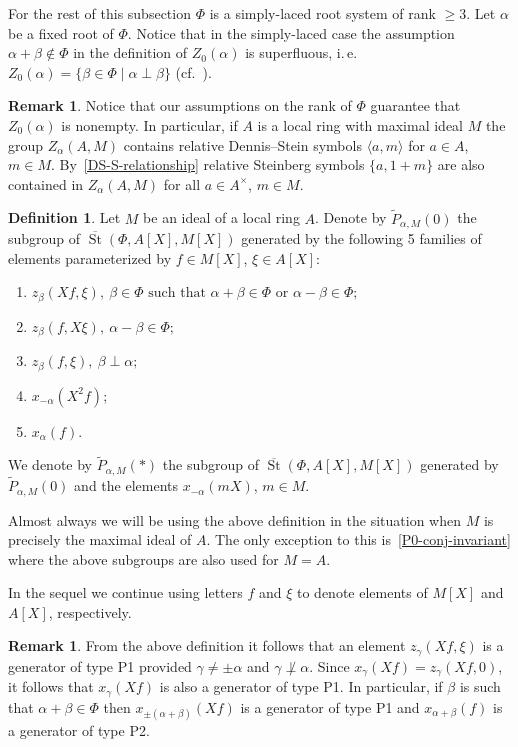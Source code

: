 \documentclass[10pt,a4paper,twoside]{article}
\theoremstyle{remark}
\theoremstyle{definition}
\numberwithin{lemma}{section}
\numberwithin{prop}{section}
\numberwithin{corollary}{section}
\numberwithin{externaltheorem}{section}
\newtheorem{df}[lemma]{Definition} \Crefname{df}{Definition}{Definitions}
\newtheorem{rem}[lemma]{Remark}
\DeclareMathOperator{\St}{St}
\numberwithin{equation}{section}
\begin{document}
For the rest of this subsection $\Phi$ is a simply-laced root system of rank $\geq 3$.
Let $\alpha$ be a fixed root of $\Phi$. 
Notice that in the simply-laced case the assumption $\alpha+\beta\not\in \Phi$ in the definition of $Z_0(\alpha)$ is superfluous, i.\,e. $Z_0(\alpha) = \{ \beta\in\Phi \mid \alpha \perp \beta \}$
(cf.~\cite[Proposition~5.7]{St71}).

\begin{rem}\label{Z-DS} Notice that our assumptions on the rank of $\Phi$ guarantee that $Z_0(\alpha)$ is nonempty. In particular, if $A$ is a local ring with maximal ideal $M$ the group $Z_\alpha(A, M)$ contains relative Dennis--Stein symbols $\langle a, m \rangle$ for $a\in A$, $m\in M$.
By~\eqref{DS-S-relationship} relative Steinberg symbols $\{a, 1+m\}$ are also contained in $Z_\alpha(A, M)$ for all $a\in A^\times$, $m\in M$. \end{rem}

\begin{df}\label{defP0}
Let $M$ be an ideal of a local ring $A$. Denote by $\widetilde{P}_{\alpha, M}(0)$ the subgroup of $\overline{\St}(\Phi, A[X], M[X])$ generated by the following 5 families of elements parameterized by $f \in M[X]$, $\xi \in A[X]$:
\begin{enumerate}[label=(P\arabic*)]
 \item $z_{\beta}(Xf, \xi),\ \beta \in \Phi \text{ such that }\alpha + \beta \in \Phi\text{ or } \alpha - \beta \in \Phi;$
 \item $z_{\beta}(f, X\xi),\ \alpha - \beta \in \Phi;$
 \item $z_{\beta}(f, \xi),\ \beta \perp \alpha;$
 \item $x_{-\alpha}(X^2f)$;
 \item $x_{\alpha}(f)$. \end{enumerate}

We denote by $\widetilde{P}_{\alpha, M}(*)$ the subgroup of $\overline{\St}(\Phi, A[X], M[X])$ generated by $\widetilde{P}_{\alpha, M}(0)$ and the elements $x_{-\alpha}(mX)$, $m \in M$.
\end{df}
Almost always we will be using the above definition in the situation when $M$ is precisely the maximal ideal of $A$. The only exception to this is~\cref{P0-conj-invariant} where the above subgroups are also used for $M=A$.

In the sequel we continue using letters $f$ and $\xi$ to denote elements of $M[X]$ and $A[X]$, respectively.

\begin{rem} \label{rem:recognition} From the above definition it follows that an element $z_\gamma(Xf, \xi)$ is a generator of type P1 provided $\gamma\neq\pm\alpha$ and $\gamma \not \perp \alpha$. Since $x_\gamma(Xf) = z_\gamma(Xf, 0)$, it follows that $x_{\gamma}(Xf)$ is also a generator of type P1. In particular, if $\beta$ is such that $\alpha + \beta \in \Phi$ then $x_{\pm(\alpha+\beta)}(Xf)$ is a generator of type P1 and $x_{\alpha+\beta}(f)$ is a generator of type P2. \end{rem}
\end{document}
